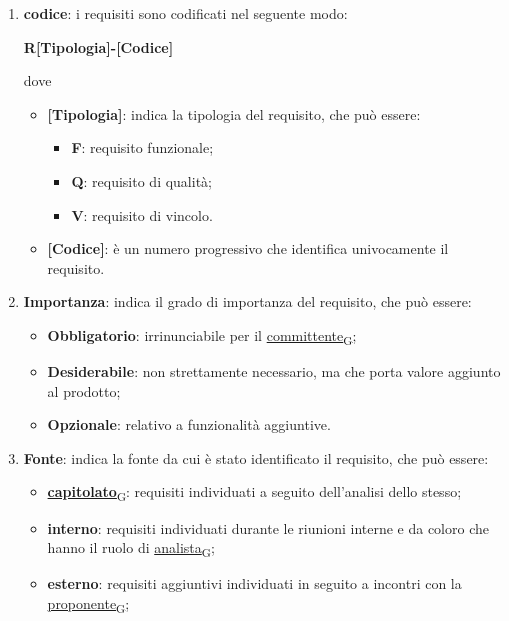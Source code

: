 \begin{enumerate}
	\item \textbf{codice}: i requisiti sono codificati nel seguente modo:
	      \begin{center}
		      \textbf{R[Tipologia]-[Codice]}
	      \end{center}
	      dove
	      \begin{itemize}
		      \item \textbf{[Tipologia]}: indica la tipologia del requisito, che può essere:
		            \begin{itemize}
			            \item \textbf{F}: requisito funzionale;
			            \item \textbf{Q}: requisito di qualità;
			            \item \textbf{V}: requisito di vincolo.
		            \end{itemize}
		      \item \textbf{[Codice]}: è un numero progressivo che identifica univocamente il requisito.
	      \end{itemize}
	\item \textbf{Importanza}: indica il grado di importanza del requisito, che può essere:
	      \begin{itemize}
		      \item \textbf{Obbligatorio}: irrinunciabile per il \href{https://7last.github.io/docs/rtb/documentazione-interna/glossario\#committente}{committente\textsubscript{G}};
		      \item \textbf{Desiderabile}: non strettamente necessario, ma che porta valore aggiunto al prodotto;
		      \item \textbf{Opzionale}: relativo a funzionalità aggiuntive.
	      \end{itemize}
	\item \textbf{Fonte}: indica la fonte da cui è stato identificato il requisito, che può essere:
	      \begin{itemize}
		      \item \href{https://7last.github.io/docs/rtb/documentazione-interna/glossario\#capitolato}{\textbf{capitolato}\textsubscript{G}}: requisiti individuati a seguito dell'analisi dello stesso;
		      \item \textbf{interno}: requisiti individuati durante le riunioni interne e da coloro che hanno il ruolo di \href{https://7last.github.io/docs/rtb/documentazione-interna/glossario\#analista}{analista\textsubscript{G}};
		      \item \textbf{esterno}: requisiti aggiuntivi individuati in seguito a incontri con la \href{https://7last.github.io/docs/rtb/documentazione-interna/glossario\#proponente}{proponente\textsubscript{G}};

\end{itemize}
\end{enumerate}
